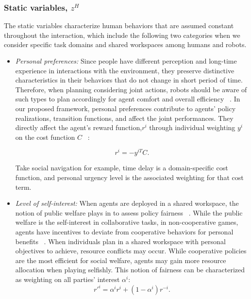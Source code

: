 \documentclass[letterpaper, 10 pt, conference]{ieeeconf}  %
\begin{document}
\subsubsection{Static variables, $z^H$}
The static variables characterize human behaviors that are assumed constant 
throughout the interaction, which include the following two categories when we 
consider specific task domains and shared workspaces among humans and robots. 

\begin{itemize}
	\item \textit{Personal preferences:} Since people have different perception 
    and long-time experience in interactions with the environment, they 
    preserve distinctive characteristics in their behaviors that do not change 
    in short period of time. Therefore, when planning considering joint 
    actions, robots should be aware of such types to plan accordingly for 
    agent comfort and overall efficiency ~\cite{gombolay2015coordination}. In 
    our proposed framework, personal preferences contribute to agents' policy 
    realizations, transition functions, and affect the joint performances. 
    They directly affect the agent's reward function,$r^i$ through individual 
    weighting $y^i$ on the cost function $C$ ~\cite{dorsa2017active}:
	
    \begin{equation}
	r^i = -y^{iT}C. 
	\end{equation}
	
	Take social navigation for 
    example, time delay is a domain-specific cost function, and personal 
    urgency level is the associated weighting for that cost term.
	\item \textit{Level of self-interest:} When agents are deployed in a shared workspace, the notion of public welfare plays in to assess policy fairness ~\cite{fehr2004social}. While the public welfare is the self-interest in collaborative tasks, in non-cooperative games, agents have incentives to deviate from cooperative behaviors for personal benefits ~\cite{fujiwara2015non}. When individuals plan in a shared workspace with personal objectives to achieve, resource conflicts may occur. 
	While cooperative policies are the most efficient for social welfare, agents may gain more resource allocation when playing selfishly. This notion of fairness can be characterized as weighting on all parties' interest $\alpha^i$:
	\begin{equation}
    r'^{i} = \alpha^ir^i+ ({1-\alpha^i}) r^{-i}.
	\end{equation}
	
\end{itemize}
\end{document}
